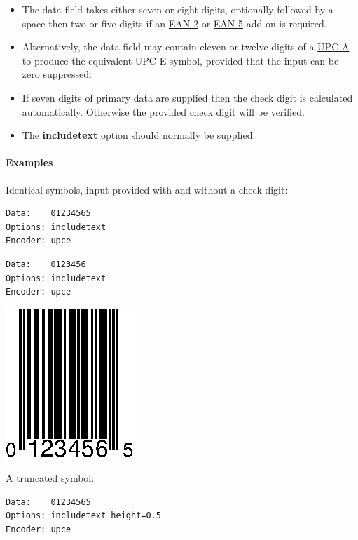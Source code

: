 \begin{itemize}
\tightlist
\item
  The data field takes either seven or eight digits, optionally followed
  by a space then two or five digits if an
  \protect\hyperlink{ean-2}{EAN-2} or \protect\hyperlink{ean-5}{EAN-5}
  add-on is required.
\item
  Alternatively, the data field may contain eleven or twelve digits of a
  \protect\hyperlink{upc-a}{UPC-A} to produce the equivalent UPC-E
  symbol, provided that the input can be zero suppressed.
\item
  If seven digits of primary data are supplied then the check digit is
  calculated automatically. Otherwise the provided check digit will be
  verified.
\item
  The \textbf{includetext} option should normally be supplied.
\end{itemize}

\hypertarget{examples-3}{%
\paragraph{Examples}\label{examples-3}}

Identical symbols, input provided with and without a check digit:

\begin{verbatim}
Data:    01234565
Options: includetext
Encoder: upce
\end{verbatim}

\begin{verbatim}
Data:    0123456
Options: includetext
Encoder: upce
\end{verbatim}

\includegraphics{images/upce-1.eps}

A truncated symbol:

\begin{verbatim}
Data:    01234565
Options: includetext height=0.5
Encoder: upce
\end{verbatim}

